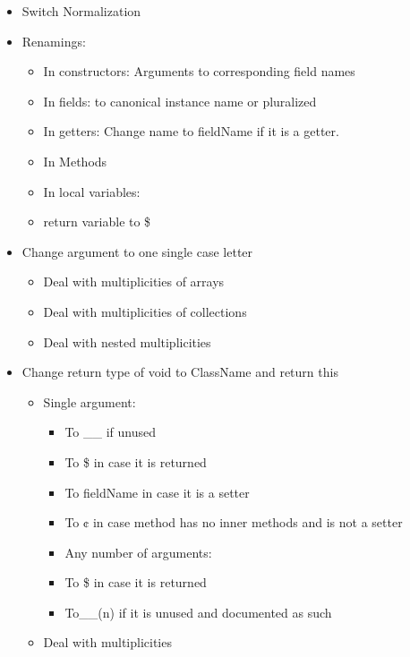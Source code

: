 \begin{itemize}
\item Switch Normalization
\item Renamings:
\begin{itemize}
  \item In constructors: Arguments to corresponding field names
  \item In fields: to canonical instance name or pluralized
  \item In getters: Change name to fieldName if it is a getter.
  \item In Methods
  \item In local variables:
  \item return variable to \$
\end{itemize}
\item Change argument to one single case letter
\begin{itemize}
  \item Deal with multiplicities of arrays
  \item Deal with multiplicities of collections
  \item Deal with nested multiplicities
\end{itemize}
\item Change return type of void to ClassName and return this
\begin{itemize}
  \item Single argument:
  \begin{itemize}
    \item To \_\_ if unused
    \item To \$ in case it is returned
    \item To fieldName in case it is a setter
    \item To ¢ in case method has no inner methods and is not a setter
   \end{itemize}
  \begin{itemize}
    \item Any number of arguments:
    \item To \$ in case it is returned
    \item To__(n) if it is unused and documented as such
   \end{itemize}
  \item Deal with multiplicities
\end{itemize}
\end{itemize}
